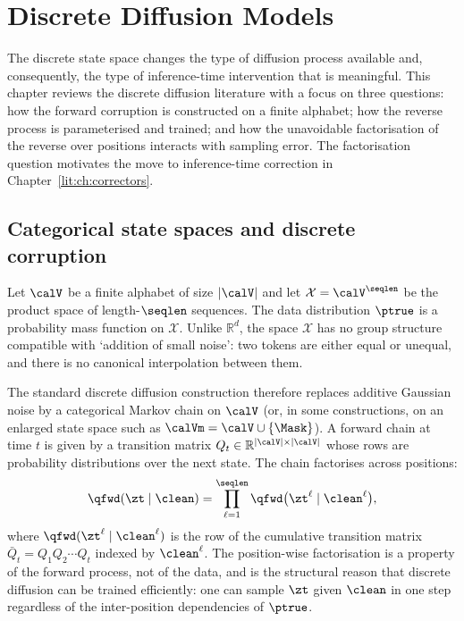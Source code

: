 
\chapter{Discrete Diffusion Models}
\label{lit:ch:discrete-diffusion}

The discrete state space changes the type of diffusion process available
and, consequently, the type of inference-time intervention that is
meaningful. This chapter reviews the discrete diffusion literature with a
focus on three questions: how the forward corruption is constructed on a
finite alphabet; how the reverse process is parameterised and trained; and
how the unavoidable factorisation of the reverse over positions interacts
with sampling error. The factorisation question motivates the move to
inference-time correction in Chapter~\ref{lit:ch:correctors}.

\section{Categorical state spaces and discrete corruption}
\label{lit:sec:categorical}

Let $\calV$ be a finite alphabet of size $|\calV|$ and let
$\mathcal{X}=\calV^{\seqlen}$ be the product space of length-$\seqlen$
sequences. The data distribution $\ptrue$ is a probability mass function on
$\mathcal{X}$. Unlike $\mathbb{R}^d$, the space $\mathcal{X}$ has no group
structure compatible with `addition of small noise': two tokens are either
equal or unequal, and there is no canonical interpolation between them.

The standard discrete diffusion construction therefore replaces additive
Gaussian noise by a categorical Markov chain on $\calV$ (or, in some
constructions, on an enlarged state space such as $\calVm = \calV\cup\{\Mask\}$).
A forward chain at time $t$ is given by a transition matrix
$Q_t\in\mathbb{R}^{|\calV|\times|\calV|}$ whose rows are probability
distributions over the next state. The chain factorises across positions:
\[
  \qfwd(\zt \mid \clean)
  = \prod_{\ell=1}^{\seqlen} \qfwd\big(\zt^\ell \mid \clean^\ell\big),
\]
where $\qfwd(\zt^\ell \mid \clean^\ell)$ is the row of the cumulative
transition matrix $\bar Q_t = Q_1 Q_2 \cdots Q_t$ indexed by $\clean^\ell$.
The position-wise factorisation is a property of the forward process, not of
the data, and is the structural reason that discrete diffusion can be
trained efficiently: one can sample $\zt$ given $\clean$ in one step
regardless of the inter-position dependencies of $\ptrue$.

